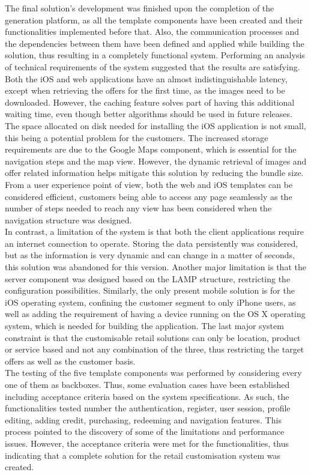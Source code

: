 The final solution's development was finished upon the completion of the generation platform, as all the template components have been created and their functionalities implemented before that. Also, the communication processes and the dependencies between them have been defined and applied while building the solution, thus resulting in a completely functional system. Performing an analysis of technical requirements of the system suggested that the results are satisfying. Both the iOS and web applications have an almost indistinguishable latency, except when retrieving the offers for the first time, as the images need to be downloaded. However, the caching feature solves part of having this additional waiting time, even though better algorithms should be used in future releases. The space allocated on disk needed for installing the iOS application is not small, this being a potential problem for the customers. The increased storage requirements are due to the Google Maps component, which is essential for the navigation steps and the map view. However, the dynamic retrieval of images and offer related information helps mitigate this solution by reducing the bundle size. From a user experience point of view, both the web and iOS templates can be considered efficient, customers being able to access any page seamlessly as the number of steps needed to reach any view has been considered when the navigation structure was designed. \\

In contrast, a limitation of the system is that both the client applications require an internet connection to operate. Storing the data persistently was considered, but as the information is very dynamic and can change in a matter of seconds, this solution was abandoned for this version. Another major limitation is that the server component was designed based on the LAMP structure, restricting the configuration possibilities. Similarly, the only present mobile solution is for the iOS operating system, confining the customer segment to only iPhone users, as well as adding the requirement of having a device running on the OS X operating system, which is needed for building the application. The last major system constraint is that the customisable retail solutions can only be location, product or service based and not any combination of the three, thus restricting the target offers as well as the customer basis. \\

The testing of the five template components was performed by considering every one of them as backboxes. Thus, some evaluation cases have been established including acceptance criteria based on the system specifications. As such, the functionalities tested number the authentication, register, user session, profile editing, adding credit, purchasing, redeeming and navigation features. This process pointed to the discovery of some of the limitations and performance issues. However, the acceptance criteria were met for the functionalities, thus indicating that a complete solution for the retail customisation system was created.









